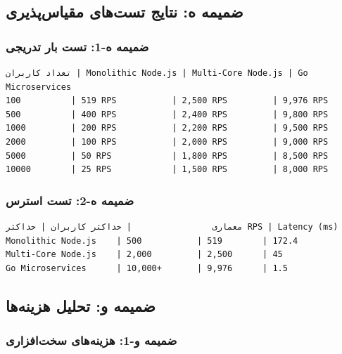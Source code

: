 \documentclass[
]{article}
\begin{document}
\subsection{ضمیمه ه: نتایج تست‌های
مقیاس‌پذیری}\label{ux636ux645ux6ccux645ux647-ux647-ux646ux62aux627ux6ccux62c-ux62aux633ux62aux647ux627ux6cc-ux645ux642ux6ccux627ux633ux67eux630ux6ccux631ux6cc}

\subsubsection{ضمیمه ه-1: تست بار
تدریجی}\label{ux636ux645ux6ccux645ux647-ux647-1-ux62aux633ux62a-ux628ux627ux631-ux62aux62fux631ux6ccux62cux6cc}

\begin{verbatim}
تعداد کاربران | Monolithic Node.js | Multi-Core Node.js | Go Microservices
100          | 519 RPS           | 2,500 RPS         | 9,976 RPS
500          | 400 RPS           | 2,400 RPS         | 9,800 RPS
1000         | 200 RPS           | 2,200 RPS         | 9,500 RPS
2000         | 100 RPS           | 2,000 RPS         | 9,000 RPS
5000         | 50 RPS            | 1,800 RPS         | 8,500 RPS
10000        | 25 RPS            | 1,500 RPS         | 8,000 RPS
\end{verbatim}

\subsubsection{ضمیمه ه-2: تست
استرس}\label{ux636ux645ux6ccux645ux647-ux647-2-ux62aux633ux62a-ux627ux633ux62aux631ux633}

\begin{verbatim}
معماری                | حداکثر کاربران | حداکثر RPS | Latency (ms)
Monolithic Node.js    | 500           | 519        | 172.4
Multi-Core Node.js    | 2,000         | 2,500      | 45
Go Microservices      | 10,000+       | 9,976      | 1.5
\end{verbatim}

\subsection{ضمیمه و: تحلیل
هزینه‌ها}\label{ux636ux645ux6ccux645ux647-ux648-ux62aux62dux644ux6ccux644-ux647ux632ux6ccux646ux647ux647ux627}

\subsubsection{ضمیمه و-1: هزینه‌های
سخت‌افزاری}\label{ux636ux645ux6ccux645ux647-ux648-1-ux647ux632ux6ccux646ux647ux647ux627ux6cc-ux633ux62eux62aux627ux641ux632ux627ux631ux6cc}
\end{document}
